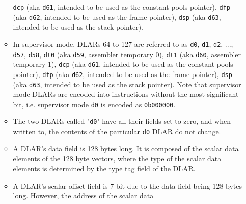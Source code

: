 \documentclass{article}
\begin{document}
\begin{itemize}
\begin{itemize}
			\texttt{dcp} (aka \texttt{d61},
				intended to be used as the constant pools pointer),
			\texttt{dfp} (aka \texttt{d62},
				intended to be used as the frame pointer),
			\texttt{dsp} (aka \texttt{d63},
				intended to be used as the stack pointer).
		\item In supervisor mode, DLARs 64 to 127 are referred to as
			\texttt{d0}, \texttt{d1}, \texttt{d2}, ..., \texttt{d57},
			\texttt{d58},
			\texttt{dt0} (aka \texttt{d59}, assembler temporary 0),
			\texttt{dt1} (aka \texttt{d60}, assembler temporary 1),
			\texttt{dcp} (aka \texttt{d61},
				intended to be used as the constant pools pointer),
			\texttt{dfp} (aka \texttt{d62},
				intended to be used as the frame pointer),
			\texttt{dsp} (aka \texttt{d63},
				intended to be used as the stack pointer).
			Note that supervisor mode DLARs are encoded into instructions
			without the most significant bit, i.e. supervisor mode
			\texttt{d0} is encoded as \texttt{0b000000}.
		\item The two DLARs called "\texttt{d0}" have all their fields set
			to zero, and when written to, the contents of the particular
			\texttt{d0} DLAR do not change.
		\item A DLAR's data field is 128 bytes long. It is composed of the
			scalar data elements of the 128 byte vectors, where the type of
			the scalar data elements is determined by the type tag field of
			the DLAR.
		\item A DLAR's scalar offset field is 7-bit due to the data field
			being 128 bytes long. However, the address of the scalar data

\end{itemize}
\end{itemize}
\end{document}
